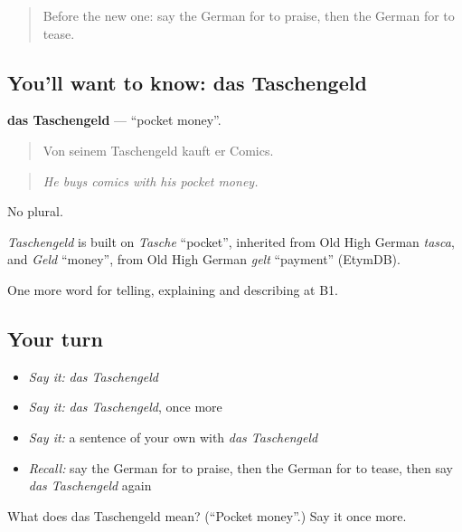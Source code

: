 \begin{quote}
Before the new one: say the German for to praise, then the German for to tease.
\end{quote}

\subsection*{You'll want to know: das Taschengeld}
\textbf{das Taschengeld} — \textquotedblleft{}pocket money\textquotedblright{}.

\begin{quote}
Von seinem Taschengeld kauft er Comics.
\end{quote}

\begin{quote}
\emph{He buys comics with his pocket money.}
\end{quote}

No plural.

\begin{cousinweb}
\emph{Taschengeld} is built on \emph{Tasche} \textquotedblleft{}pocket\textquotedblright{}, inherited from Old High German \emph{tasca}, and \emph{Geld} \textquotedblleft{}money\textquotedblright{}, from Old High German \emph{gelt} \textquotedblleft{}payment\textquotedblright{} (EtymDB).
\end{cousinweb}

\begin{grammarlens}[title={What you've built}]
One more word for telling, explaining and describing at B1.
\end{grammarlens}

\subsection*{Your turn}
\begin{itemize}
\raggedright
  \item \emph{Say it:} \emph{das Taschengeld}
  \item \emph{Say it:} \emph{das Taschengeld}, once more
  \item \emph{Say it:} a sentence of your own with \emph{das Taschengeld}
  \item \emph{Recall:} say the German for to praise, then the German for to tease, then say \emph{das Taschengeld} again
\end{itemize}

\begin{tcolorbox}[breakable,colback=teal!4,colframe=teal!35!black,title={Before you move on}]
What does das Taschengeld mean? (\textquotedblleft{}Pocket money\textquotedblright{}.) Say it once more.
\end{tcolorbox}
